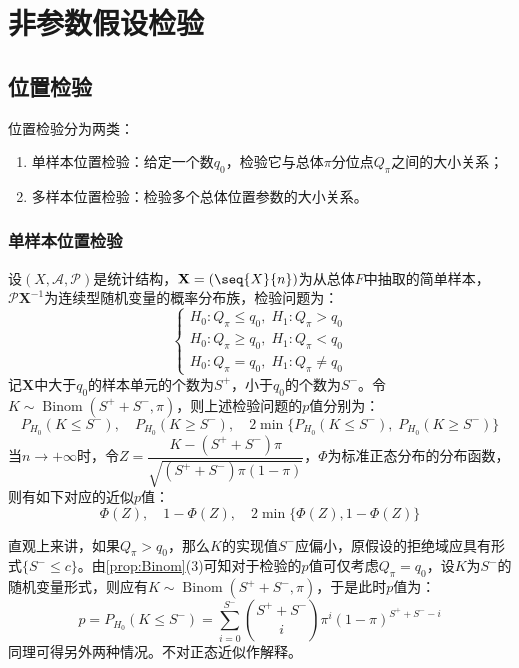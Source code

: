 \section{非参数假设检验}

\subsection{位置检验}
位置检验分为两类：
\begin{enumerate}
	\item 单样本位置检验：给定一个数$q_0$，检验它与总体$\pi$分位点$Q_{\pi}$之间的大小关系；
	\item 多样本位置检验：检验多个总体位置参数的大小关系。
\end{enumerate}
\subsubsection{单样本位置检验}
\begin{method}
	设$(X,\mathscr{A},\mathscr{P})$是统计结构，$\mathbf{X}=(\seq{X}{n})$为从总体$F$中抽取的简单样本，$\mathscr{P}\mathbf{X}^{-1}$为连续型随机变量的概率分布族，检验问题为：
	\begin{equation*}
		\begin{cases}
			H_0:Q_\pi\leqslant q_0,\;H_1:Q_\pi>q_0 \\
			H_0:Q_\pi\geqslant q_0,\;H_1:Q_\pi<q_0 \\
			H_0:Q_\pi=q_0,\;H_1:Q_\pi\ne q_0
		\end{cases}
	\end{equation*}
	记$\mathbf{X}$中大于$q_0$的样本单元的个数为$S^+$，小于$q_0$的个数为$S^-$。令$K\sim\operatorname{Binom}(S^++S^-,\pi)$，则上述检验问题的$p$值分别为：
	\begin{equation*}
		P_{H_0}(K\leqslant S^-),\quad P_{H_0}(K\geqslant S^-),\quad 2\min\{P_{H_0}(K\leqslant S^-),\;P_{H_0}(K\geqslant S^-)\}
	\end{equation*}
	当$n\to+\infty$时，令$Z=\dfrac{K-(S^++S^-)\pi}{\sqrt{(S^++S^-)\pi(1-\pi)}}$，$\Phi$为标准正态分布的分布函数，则有如下对应的近似$p$值：
	\begin{equation*}
		\Phi(Z),\quad1-\Phi(Z),\quad2\min\{\Phi(Z),1-\Phi(Z)\}
	\end{equation*}
\end{method}
\begin{derivation}
	直观上来讲，如果$Q_{\pi}>q_0$，那么$K$的实现值$S^-$应偏小，原假设的拒绝域应具有形式$\{S^-\leqslant c\}$。由\cref{prop:Binom}(3)可知对于检验的$p$值可仅考虑$Q_\pi=q_0$，设$K$为$S^-$的随机变量形式，则应有$K\sim\operatorname{Binom}(S^++S^-,\pi)$，于是此时$p$值为：
	\begin{equation*}
		p=P_{H_0}(K\leqslant S^-)=\sum_{i=0}^{S^-}\binom{S^++S^-}{i}\pi^{i}(1-\pi)^{S^++S^--i}
	\end{equation*}
	同理可得另外两种情况。不对正态近似作解释。
\end{derivation}
